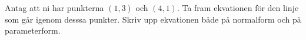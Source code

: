 Antag att ni har punkterna $(1,3)$ och $(4,1)$. Ta fram ekvationen för den linje som går igenom desssa punkter. Skriv upp ekvationen både på normalform och på parameterform.